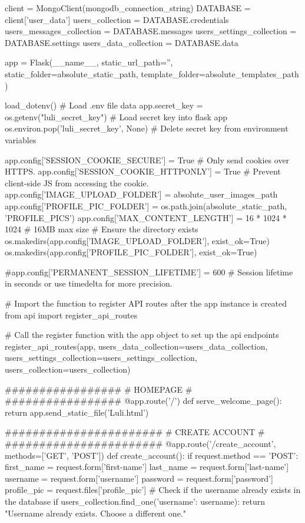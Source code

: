 \documentclass[12pt]{article} %
\begin{document}
\begin{pythoncode}[caption={Main Flask Backend Code}]
    client = MongoClient(mongodb_connection_string) 
    DATABASE = client['user_data']  
    users_collection = DATABASE.credentials
    users_messages_collection = DATABASE.messages
    users_settings_collection = DATABASE.settings
    users_data_collection = DATABASE.data
    
    app = Flask(__name__,
                static_url_path='', 
                static_folder=absolute_static_path,
                template_folder=absolute_templates_path )
    
    load_dotenv() # Load .env file data
    app.secret_key = os.getenv("luli_secret_key") # Load secret key into flask app
    os.environ.pop('luli_secret_key', None) # Delete secret key from environment variables
    
    
    app.config['SESSION_COOKIE_SECURE'] = True  # Only send cookies over HTTPS.
    app.config['SESSION_COOKIE_HTTPONLY'] = True  # Prevent client-side JS from accessing the cookie.
    app.config['IMAGE_UPLOAD_FOLDER'] = absolute_user_images_path
    app.config['PROFILE_PIC_FOLDER'] = os.path.join(absolute_static_path, 'PROFILE_PICS')
    app.config['MAX_CONTENT_LENGTH'] = 16 * 1024 * 1024  # 16MB max size
    # Ensure the directory exists
    os.makedirs(app.config['IMAGE_UPLOAD_FOLDER'], exist_ok=True)
    os.makedirs(app.config['PROFILE_PIC_FOLDER'], exist_ok=True)
    
    #app.config['PERMANENT_SESSION_LIFETIME'] = 600  # Session lifetime in seconds or use timedelta for more precision.
    
    
    # Import the function to register API routes after the app instance is created
    from api import register_api_routes
    
    # Call the register function with the app object to set up the api endpoints
    register_api_routes(app, users_data_collection=users_data_collection, users_settings_collection=users_settings_collection, users_collection=users_collection)
    
    #################
    #   HOMEPAGE    #
    #################
    @app.route('/')
    def serve_welcome_page():
        return app.send_static_file('Luli.html')
    
    
    #######################
    #   CREATE ACCOUNT    #
    #######################
    @app.route('/create_account', methods=['GET', 'POST'])
    def create_account():
        if request.method == 'POST':
            first_name = request.form['first-name']
            last_name = request.form['last-name']
            username = request.form['username']
            password = request.form['password']
            profile_pic = request.files['profile_pic']
            # Check if the username already exists in the database
            if users_collection.find_one({'username': username}):
                return "Username already exists. Choose a different one."
            

\end{pythoncode}
\end{document}
